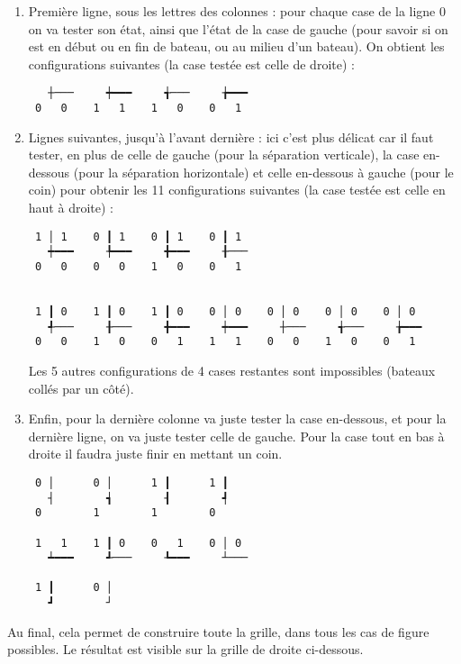 \begin{enumerate}
\item Première ligne, sous les lettres des colonnes : pour chaque case de la ligne $0$ on va tester son état, ainsi que l'état de la case de gauche (pour savoir si on est en début ou en fin de bateau, ou au milieu d'un bateau). On obtient les configurations suivantes (la case testée est celle de droite) :

\begin{verbatim}
   ┼───     ┿━━━     ╅───     ╆━━━
 0   0    1   1    1   0    0   1
\end{verbatim}


\item Lignes suivantes, jusqu'à l'avant dernière : ici c'est plus délicat car il faut tester, en plus de celle de gauche (pour la séparation verticale), la case en-dessous (pour la séparation horizontale) et celle en-dessous à gauche (pour le coin) pour obtenir les 11 configurations suivantes (la case testée est celle en haut à droite) :

\begin{verbatim}
 1 │ 1    0 ┃ 1    0 ┃ 1    0 ┃ 1
   ┿━━━     ╄━━━     ╋━━━     ╂───
 0   0    0   0    1   0    0   1
  
 
 1 ┃ 0    1 ┃ 0    1 ┃ 0    0 │ 0    0 │ 0    0 │ 0    0 │ 0
   ╃───     ╂───     ╋━━━     ┿━━━     ┼───     ╅───     ╆━━━
 0   0    1   0    0   1    1   1    0   0    1   0    0   1
\end{verbatim}

Les 5 autres configurations de 4 cases restantes sont impossibles (bateaux collés par un côté).

\item Enfin, pour la dernière colonne va juste tester la case en-dessous, et pour la dernière ligne, on va juste tester celle de gauche. Pour la case tout en bas à droite il faudra juste finir en mettant un coin.

\begin{verbatim}
 0 │      0 │      1 ┃      1 ┃  
   ┤        ┪        ┨        ┩
 0        1        1        0
 
 1   1    1 ┃ 0    0   1    0 │ 0
   ┷━━━     ┹───     ┺━━━     ┴───

 1 ┃      0 │
   ┛        ┘
\end{verbatim}
\end{enumerate}

Au final, cela permet de construire toute la grille, dans tous les cas de figure possibles. Le résultat est visible sur la grille de droite ci-dessous.

